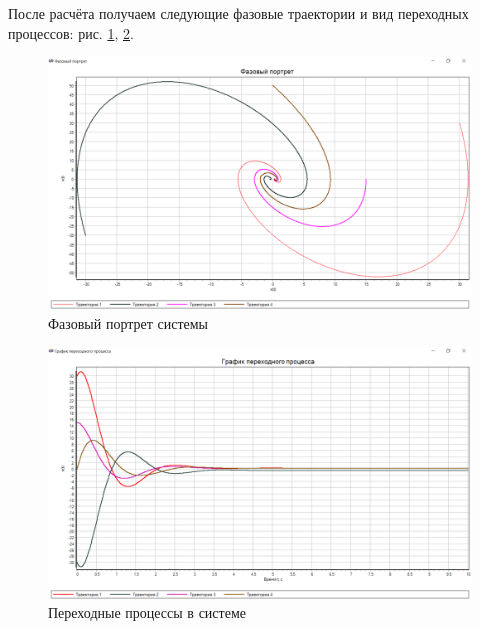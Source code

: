 	
	После расчёта получаем следующие фазовые траектории и вид переходных процессов: рис. \ref{s_FP}, \ref{s_PP}.
	
	\begin{figure}[h]
		\centering\includegraphics[width=.8\textwidth]{png/ФП_simintech.png}	
		\caption{Фазовый портрет системы}
		\label{s_FP}
	\end{figure}
	
	\begin{figure}[h]
		\centering\includegraphics[width=.7\textwidth]{png/ПП_simintech.png}	
		\caption{Переходные процессы в системе}
		\label{s_PP}
	\end{figure}
	
